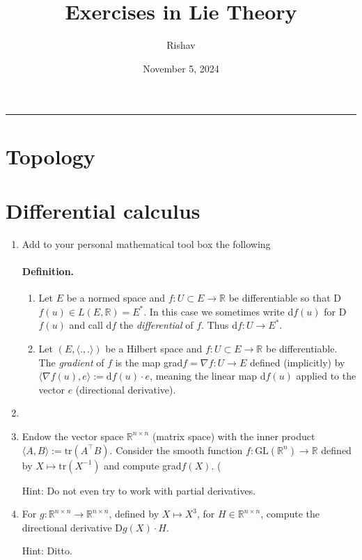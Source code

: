 \documentclass{article}
\title{Exercises in Lie Theory}
\date{November 5, 2024}
\author{Rishav}
\begin{document}
\maketitle
\hrule
\tableofcontents
\newpage

\section{Topology}

\section{Differential calculus}

\begin{enumerate}[start=9]
  \item Add to your personal mathematical tool box the following
  \paragraph{Definition.}

  \begin{enumerate}
    \item Let $E$ be a normed space and $f:U\subset E\rightarrow\mathbb{R}$ be differentiable so that D$f(u)\in L(E,\mathbb{R})=E^{*}$. In this case we sometimes write d$f(u)$ for D$f(u)$ and call d$f$ the \textit{differential} of $f$. Thus d$f:U\rightarrow E^{*}$.

    \item Let $(E, \langle.,.\rangle)$ be a Hilbert space and $f:U\subset E\rightarrow\mathbb{R}$ be differentiable. The \textit{gradient} of $f$ is the map grad$f=\nabla f:U\rightarrow E$ defined (implicitly) by $\langle\nabla f(u), e\rangle:=\text{d}f(u)\cdot e$, meaning the linear map d$f(u)$ applied to the vector $e$ (directional derivative).
  \end{enumerate}

  \item

  \item Endow the vector space $\mathbb{R}^{n\times n}$ (matrix space) with the inner product $\langle A,B\rangle:=\text{tr}(A^{\top}B)$. Consider the smooth function $f:\text{GL}(\mathbb{R}^{n})\rightarrow\mathbb{R}$ defined by $X\mapsto\text{tr}(X^{-1})$ and compute grad$f(X)$. (

  {\footnotesize Hint: Do not even try to work with partial derivatives.}

  \item For $g:\mathbb{R}^{n\times n}\rightarrow\mathbb{R}^{n\times n}$, defined by $X\mapsto X^{3}$, for $H\in\mathbb{R}^{n\times n}$, compute the directional derivative D$g(X)\cdot H$.

  {\footnotesize Hint: Ditto.}
\end{enumerate}
\end{document}
